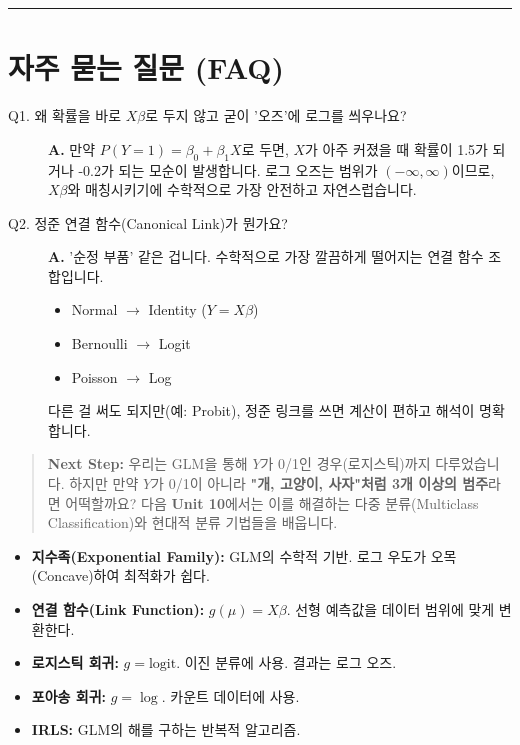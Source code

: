 \documentclass[11pt,a4paper]{book}
\theoremstyle{definition}
\begin{document}
\vspace{0.5cm}\hrule\vspace{0.5cm}

\section{자주 묻는 질문 (FAQ)}

\begin{description}
    \item[Q1. 왜 확률을 바로 $X\beta$로 두지 않고 굳이 '오즈'에 로그를 씌우나요?]
    \textbf{A.} 만약 $P(Y=1) = \beta_0 + \beta_1 X$로 두면, $X$가 아주 커졌을 때 확률이 1.5가 되거나 -0.2가 되는 모순이 발생합니다. 로그 오즈는 범위가 $(-\infty, \infty)$이므로, $X\beta$와 매칭시키기에 수학적으로 가장 안전하고 자연스럽습니다.
    
    \item[Q2. 정준 연결 함수(Canonical Link)가 뭔가요?]
    \textbf{A.} '순정 부품' 같은 겁니다. 수학적으로 가장 깔끔하게 떨어지는 연결 함수 조합입니다.
    \begin{itemize}
        \item Normal $\to$ Identity ($Y=X\beta$)
        \item Bernoulli $\to$ Logit
        \item Poisson $\to$ Log
    \end{itemize}
    다른 걸 써도 되지만(예: Probit), 정준 링크를 쓰면 계산이 편하고 해석이 명확합니다.
\end{description}

\vspace{1cm}
\begin{quote}
\textbf{Next Step:} 우리는 GLM을 통해 $Y$가 0/1인 경우(로지스틱)까지 다루었습니다. 하지만 만약 $Y$가 0/1이 아니라 \textbf{"개, 고양이, 사자"처럼 3개 이상의 범주}라면 어떡할까요? 다음 \textbf{Unit 10}에서는 이를 해결하는 다중 분류(Multiclass Classification)와 현대적 분류 기법들을 배웁니다.
\end{quote}

\begin{summarybox}[title={Unit 9 핵심 요약}]
\begin{itemize}
    \item \textbf{지수족(Exponential Family):} GLM의 수학적 기반. 로그 우도가 오목(Concave)하여 최적화가 쉽다.
    \item \textbf{연결 함수(Link Function):} $g(\mu) = X\beta$. 선형 예측값을 데이터 범위에 맞게 변환한다.
    \item \textbf{로지스틱 회귀:} $g = \text{logit}$. 이진 분류에 사용. 결과는 로그 오즈.
    \item \textbf{포아송 회귀:} $g = \log$. 카운트 데이터에 사용.
    \item \textbf{IRLS:} GLM의 해를 구하는 반복적 알고리즘.
\end{itemize}
\end{summarybox}
\end{document}
